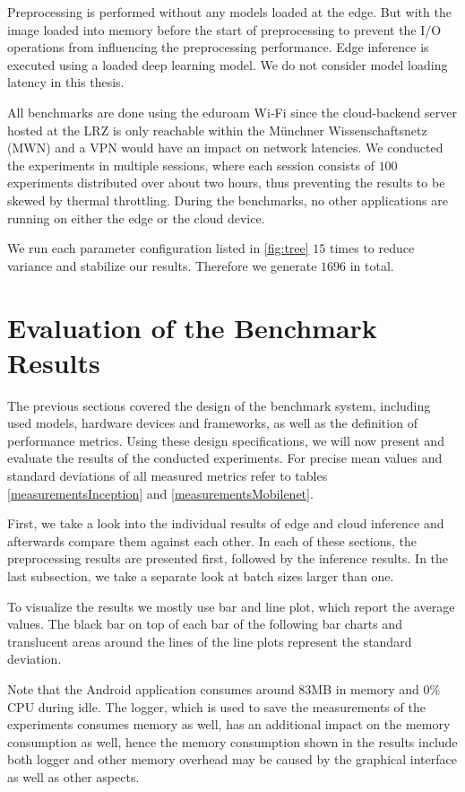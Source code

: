 Preprocessing is performed without any models loaded at the edge. But with the image loaded into memory before the start of preprocessing to prevent the I/O operations from influencing the preprocessing performance.
Edge inference is executed using a loaded deep learning model. 
We do not consider model loading latency in this thesis.

All benchmarks are done using the eduroam Wi‑Fi since the cloud-backend server hosted at the LRZ is only reachable within the Münchner Wissenschaftsnetz (MWN) and a VPN would have an impact on network latencies.
We conducted the experiments in multiple sessions, where each session consists of $100$ experiments distributed over about two hours, thus preventing the results to be skewed by thermal throttling.
During the benchmarks, no other applications are running on either the edge or the cloud device.

We run each parameter configuration listed in \ref{fig:tree} $15$ times to reduce variance and stabilize our results. Therefore we generate $1696$ in total.
\section{Evaluation of the Benchmark Results}
\label{chap:Evaluation}
The previous sections covered the design of the benchmark system, including used models, hardware devices and frameworks, as well as the definition of performance metrics. Using these design specifications, we will now present and evaluate the results of the conducted experiments.
For precise mean values and standard deviations of all measured metrics refer to tables \ref{measurementsInception} and \ref{measurementsMobilenet}.

First, we take a look into the individual results of edge and cloud inference and afterwards compare them against each other. In each of these sections, the preprocessing results are presented first, followed by the inference results.
In the last subsection, we take a separate look at batch sizes larger than one.

To visualize the results we mostly use bar and line plot, which report the average values.
The black bar on top of each bar of the following bar charts and translucent areas around the lines of the line plots represent the standard deviation.

Note that the Android application consumes around 83MB in memory and 0\% CPU during idle. The logger, which is used to save the measurements of the experiments consumes memory as well, has an additional impact on the memory consumption as well, hence the memory consumption shown in the results include both logger and other memory overhead may be caused by the graphical interface as well as other aspects.



